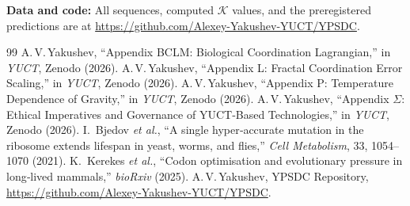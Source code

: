 \documentclass[12pt,a4paper]{article}
\newcommand{\REL}{\mathcal{K}}          %
\begin{document}
	\vspace{0.5cm}
	\noindent\textbf{Data and code:} All sequences, computed \(\REL\) values, and the preregistered predictions are at \url{https://github.com/Alexey-Yakushev-YUCT/YPSDC}.
	
	\begin{thebibliography}{99}
		 A.\,V.\,Yakushev, ``Appendix BCLM: Biological Coordination Lagrangian,'' in \emph{YUCT}, Zenodo (2026).
		 A.\,V.\,Yakushev, ``Appendix L: Fractal Coordination Error Scaling,'' in \emph{YUCT}, Zenodo (2026).
		 A.\,V.\,Yakushev, ``Appendix P: Temperature Dependence of Gravity,'' in \emph{YUCT}, Zenodo (2026).
		 A.\,V.\,Yakushev, ``Appendix \(\Sigma\): Ethical Imperatives and Governance of YUCT‑Based Technologies,'' in \emph{YUCT}, Zenodo (2026).
		 I.~Bjedov \emph{et al.}, ``A single hyper‑accurate mutation in the ribosome extends lifespan in yeast, worms, and flies,'' \emph{Cell Metabolism}, 33, 1054–1070 (2021).
		 K.~Kerekes \emph{et al.}, ``Codon optimisation and evolutionary pressure in long‑lived mammals,'' \emph{bioRxiv} (2025).
		 A.\,V.\,Yakushev, YPSDC Repository, \url{https://github.com/Alexey-Yakushev-YUCT/YPSDC}.
	\end{thebibliography}
	
\end{document}
